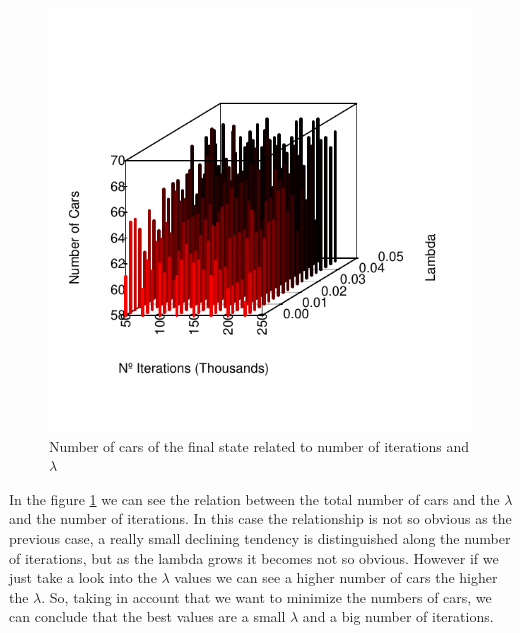 \documentclass[12]{article}
\begin{document}
    \begin{figure}[H]
    \captionsetup{justification=centering}
   		\centering
        \includegraphics[scale=0.9]{Results/data_B_2.pdf}
        \caption{Number of cars of the final state related to number of iterations and $\lambda$}
        \label{fig:data3}
    \end{figure}
        
        \vspace{1cm}
In the figure \ref{fig:data3} we can see the relation between the total number of cars and the $\lambda$ and the number of iterations. In this case the relationship is not so  obvious as the previous case, a really small declining tendency is distinguished along the number of iterations, but as the lambda grows it becomes not so obvious. However if we just take a look into the $\lambda$ values we can see a higher number of cars the higher the $\lambda$. So, taking in account that we want to minimize the numbers of cars, we can conclude that the best values are a small $\lambda$ and a big number of iterations. 
       
\end{document}
